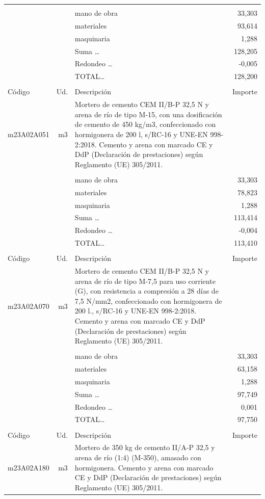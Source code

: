 \documentclass{book}%
\begin{document}
\begin{supertabular}{l r p{60mm} r}
&&&\\%
&&mano de obra&    33,303\\%
&&materiales&    93,614\\%
&&maquinaria&     1,288\\%
&&Suma \ldots&   128,205\\%
&&Redondeo \ldots&    {-}0,005\\%
%
&&TOTAL\ldots&   128,200\\%
&&&\\%
Código&Ud.&Descripción&Importe\\%
\hline%
m23A02A051&m3&Mortero de cemento CEM II/B{-}P 32,5 N y arena de río de tipo M{-}15, con una dosificación de cemento de 450 kg/m3, confeccionado con hormigonera de 200 l, s/RC{-}16 y UNE{-}EN 998{-}2:2018. Cemento y arena con marcado CE y DdP (Declaración de prestaciones) según Reglamento (UE) 305/2011.&\\%
&&&\\%
&&mano de obra&    33,303\\%
&&materiales&    78,823\\%
&&maquinaria&     1,288\\%
&&Suma \ldots&   113,414\\%
&&Redondeo \ldots&    {-}0,004\\%
%
&&TOTAL\ldots&   113,410\\%
&&&\\%
Código&Ud.&Descripción&Importe\\%
\hline%
m23A02A070&m3&Mortero de cemento CEM II/B{-}P 32,5 N y arena de río de tipo M{-}7,5 para uso corriente (G), con resistencia a compresión a 28 días de 7,5 N/mm2, confeccionado con hormigonera de 200 l., s/RC{-}16 y UNE{-}EN 998{-}2:2018. Cemento y arena con marcado CE y DdP (Declaración de prestaciones) según Reglamento (UE) 305/2011.&\\%
&&&\\%
&&mano de obra&    33,303\\%
&&materiales&    63,158\\%
&&maquinaria&     1,288\\%
&&Suma \ldots&    97,749\\%
&&Redondeo \ldots&     0,001\\%
%
&&TOTAL\ldots&    97,750\\%
&&&\\%
Código&Ud.&Descripción&Importe\\%
\hline%
m23A02A180&m3&Mortero de 350 kg de cemento II/A{-}P 32,5 y arena de río (1:4) (M{-}350), amasado con hormigonera. Cemento y arena con marcado CE y DdP (Declaración de prestaciones) según Reglamento (UE) 305/2011.&\\%

\end{supertabular}
\end{document}
